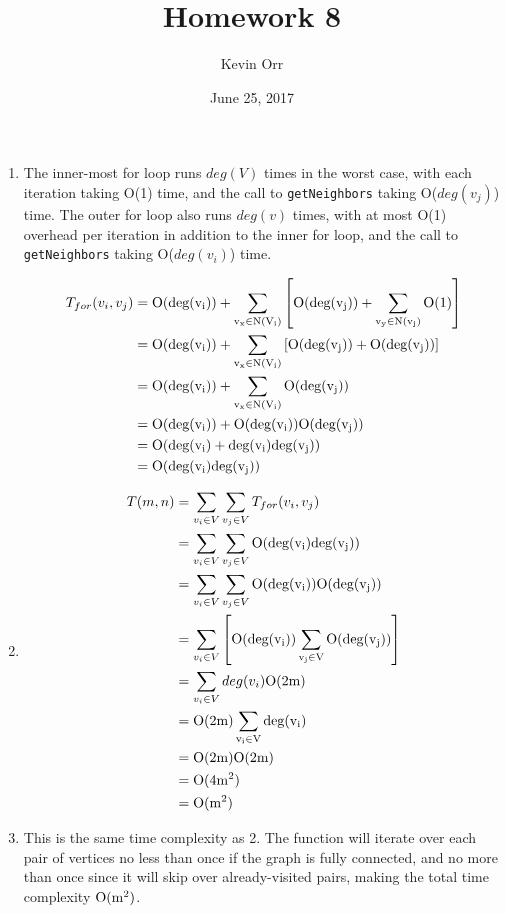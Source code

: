 \documentclass[11pt]{article}
\author{Kevin Orr}
\date{June 25, 2017}
\title{Homework 8}
\begin{document}
\maketitle
\begin{enumerate}
\item The inner-most for loop runs \(deg(V)\) times in the worst case, with each iteration taking
O(1) time, and the call to \texttt{getNeighbors} taking O(\(deg(v_j)\)) time. The outer for loop also
runs \(deg(v)\) times, with at most O(1) overhead per iteration in addition to the inner for
loop, and the call to \texttt{getNeighbors} taking O(\(deg(v_i)\)) time.

\begin{equation*}
\begin{align*}
  T_{for}(v_i, v_j) &= \rm O(deg(v_i)) + \sum_{v_x\in N(V_i)} \left[ \rm O(deg(v_j)) + \sum_{v_y\in N(v_j)} \rm O(1) \right] \\
                    &= \rm O(deg(v_i)) + \sum_{v_x\in N(V_i)} \left[ \rm O(deg(v_j)) + \rm O(deg(v_j)) \right] \\
                    &= \rm O(deg(v_i)) + \sum_{v_x\in N(V_i)} \rm O(deg(v_j)) \\
                    &= \rm O(deg(v_i)) + \rm O(deg(v_i)) \rm O(deg(v_j)) \\
                    &= \rm O(deg(v_i) + deg(v_i) deg(v_j)) \\
                    &= \rm O(deg(v_i) deg(v_j))
\end{align*}
\end{equation*}
\linebreak

\item \begin{equation*}
\begin{align*}
  T(m, n) &= \sum_{v_i \in V} \sum_{v_j \in V} T_{for}(v_i, v_j) \\
          &= \sum_{v_i \in V} \sum_{v_j \in V} \rm O(deg(v_i) deg(v_j)) \\
          &= \sum_{v_i \in V} \sum_{v_j \in V} \rm O(deg(v_i)) \rm O(deg(v_j)) \\
          &= \sum_{v_i \in V} \left[ \rm O(deg(v_i)) \sum_{v_j \in V} \rm O(deg(v_j)) \right] \\
          &= \sum_{v_i \in V} deg(v_i) \rm O(2m) \\
          &= \rm O(2m) \sum_{v_i \in V} deg(v_i) \\
          &= \rm O(2m) \rm O(2m) \\
          &= \rm O(4m^2) \\
          &= \rm O(m^2)
\end{align*}
\end{equation*}

\item This is the same time complexity as 2. The function will iterate over each pair of vertices no less than
once if the graph is fully connected, and no more than once since it will skip over already-visited pairs,
making the total time complexity \(\rm O(m^2)\).
\end{enumerate}
\end{document}

